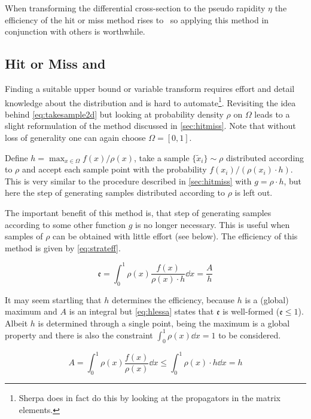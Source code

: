 When transforming the differential cross-section to the pseudo
rapidity \(\eta\) the efficiency of the hit or miss method rises
to~ so applying this method in conjunction
with others is worthwhile.

\subsection{Hit or Miss and \vegas}%
\label{sec:stratsamp}

Finding a suitable upper bound or variable transform requires effort
and detail knowledge about the distribution and is hard to
automate\footnote{Sherpa does in fact do this by looking at the
  propagators in the matrix elements.}.  Revisiting the idea
behind \cref{eq:takesample2d} but looking at probability density
\(\rho\) on \(\Omega\) leads to a slight reformulation of the method
discussed in \cref{sec:hitmiss}. Note that without loss of generality
one can again choose \(\Omega = [0, 1]\).

Define \(h=\max_{x\in\Omega}f(x)/\rho(x)\), take a sample
\(\{\tilde{x}_i\}\sim\rho\) distributed according to \(\rho\) and
accept each sample point with the probability
\(f(x_i)/(\rho(x_i)\cdot h)\).  This is very similar to the procedure
described in \cref{sec:hitmiss} with \(g=\rho\cdot h\), but here the
step of generating samples distributed according to \(\rho\) is left
out.

The important benefit of this method is, that step of generating
samples according to some other function \(g\) is no longer
necessary. This is useful when samples of \(\rho\) can be obtained
with little effort (see below). The efficiency of this method is given
by \cref{eq:strateff}.

\begin{equation}
  \label{eq:strateff}
  \mathfrak{e} = \int_0^1\rho(x)\frac{f(x)}{\rho(x)\cdot h}\dd{x} = \frac{A}{h}
\end{equation}

It may seem startling that \(h\) determines the efficiency, because
\(h\) is a (global) maximum and \(A\) is an integral
but \cref{eq:hlessa} states that \(\mathfrak{e}\) is well-formed
(\(\mathfrak{e}\leq 1\)). Albeit \(h\) is determined through a single
point, being the maximum is a global property and there is also the
constraint \(\int_0^1\rho(x)\dd{x}=1\) to be considered.

\begin{equation}
  \label{eq:hlessa}
  A = \int_0^1\rho(x)\frac{f(x)}{\rho(x)}\dd{x} \leq
  \int_0^1\rho(x)\cdot h\dd{x} = h
\end{equation}

